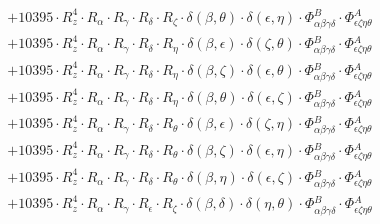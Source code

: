 \documentclass{article}
\begin{document}
\begin{equation}
\begin{array}{c}
 \\[0.2em] 		 + 10395 \cdot R_{z}^{4} \cdot R_{\alpha{}} \cdot R_{\gamma{}} \cdot R_{\delta{}} \cdot R_{\zeta{}} \cdot \delta{}\left(\beta{}, \theta{}\right) \cdot \delta{}\left(\epsilon{}, \eta{}\right) \cdot \Phi{}^{B}_{\alpha{}\beta{}\gamma{}\delta{}} \cdot \Phi{}^{A}_{\epsilon{}\zeta{}\eta{}\theta{}} 
 \\[0.2em] 		 + 10395 \cdot R_{z}^{4} \cdot R_{\alpha{}} \cdot R_{\gamma{}} \cdot R_{\delta{}} \cdot R_{\eta{}} \cdot \delta{}\left(\beta{}, \epsilon{}\right) \cdot \delta{}\left(\zeta{}, \theta{}\right) \cdot \Phi{}^{B}_{\alpha{}\beta{}\gamma{}\delta{}} \cdot \Phi{}^{A}_{\epsilon{}\zeta{}\eta{}\theta{}} 
 \\[0.2em] 		 + 10395 \cdot R_{z}^{4} \cdot R_{\alpha{}} \cdot R_{\gamma{}} \cdot R_{\delta{}} \cdot R_{\eta{}} \cdot \delta{}\left(\beta{}, \zeta{}\right) \cdot \delta{}\left(\epsilon{}, \theta{}\right) \cdot \Phi{}^{B}_{\alpha{}\beta{}\gamma{}\delta{}} \cdot \Phi{}^{A}_{\epsilon{}\zeta{}\eta{}\theta{}} 
 \\[0.2em] 		 + 10395 \cdot R_{z}^{4} \cdot R_{\alpha{}} \cdot R_{\gamma{}} \cdot R_{\delta{}} \cdot R_{\eta{}} \cdot \delta{}\left(\beta{}, \theta{}\right) \cdot \delta{}\left(\epsilon{}, \zeta{}\right) \cdot \Phi{}^{B}_{\alpha{}\beta{}\gamma{}\delta{}} \cdot \Phi{}^{A}_{\epsilon{}\zeta{}\eta{}\theta{}} 
 \\[0.2em] 		 + 10395 \cdot R_{z}^{4} \cdot R_{\alpha{}} \cdot R_{\gamma{}} \cdot R_{\delta{}} \cdot R_{\theta{}} \cdot \delta{}\left(\beta{}, \epsilon{}\right) \cdot \delta{}\left(\zeta{}, \eta{}\right) \cdot \Phi{}^{B}_{\alpha{}\beta{}\gamma{}\delta{}} \cdot \Phi{}^{A}_{\epsilon{}\zeta{}\eta{}\theta{}} 
 \\[0.2em] 		 + 10395 \cdot R_{z}^{4} \cdot R_{\alpha{}} \cdot R_{\gamma{}} \cdot R_{\delta{}} \cdot R_{\theta{}} \cdot \delta{}\left(\beta{}, \zeta{}\right) \cdot \delta{}\left(\epsilon{}, \eta{}\right) \cdot \Phi{}^{B}_{\alpha{}\beta{}\gamma{}\delta{}} \cdot \Phi{}^{A}_{\epsilon{}\zeta{}\eta{}\theta{}} 
 \\[0.2em] 		 + 10395 \cdot R_{z}^{4} \cdot R_{\alpha{}} \cdot R_{\gamma{}} \cdot R_{\delta{}} \cdot R_{\theta{}} \cdot \delta{}\left(\beta{}, \eta{}\right) \cdot \delta{}\left(\epsilon{}, \zeta{}\right) \cdot \Phi{}^{B}_{\alpha{}\beta{}\gamma{}\delta{}} \cdot \Phi{}^{A}_{\epsilon{}\zeta{}\eta{}\theta{}} 
 \\[0.2em] 		 + 10395 \cdot R_{z}^{4} \cdot R_{\alpha{}} \cdot R_{\gamma{}} \cdot R_{\epsilon{}} \cdot R_{\zeta{}} \cdot \delta{}\left(\beta{}, \delta{}\right) \cdot \delta{}\left(\eta{}, \theta{}\right) \cdot \Phi{}^{B}_{\alpha{}\beta{}\gamma{}\delta{}} \cdot \Phi{}^{A}_{\epsilon{}\zeta{}\eta{}\theta{}} 

\end{array}
\end{equation}
\end{document}
